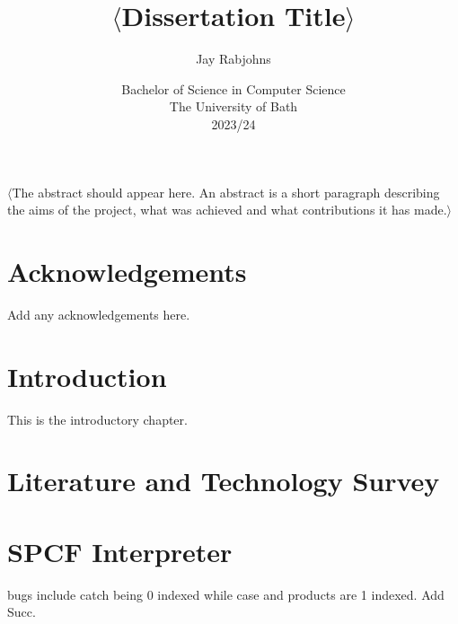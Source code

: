 \documentclass[12pt,a4paper]{report}
\title{\bf $\langle$Dissertation Title$\rangle$}
\author{Jay Rabjohns}
\date{Bachelor of Science in Computer Science\\ 
      The University of Bath\\
      2023/24}
\theoremstyle{definition}
\theoremstyle{remark}
\begin{document}
\hypersetup{pageanchor=false}

\lstset{language=Haskell,breaklines,breakatwhitespace,basicstyle=\small}

\setcounter{page}{0}

\maketitle
\newpage

\newpage

\hypersetup{pageanchor=true}
\abstract
$\langle$The abstract should appear here. An abstract is a short paragraph describing the aims of the project, what was achieved and what contributions it has made.$\rangle$
\newpage

\tableofcontents
\newpage



\chapter*{Acknowledgements}
Add any acknowledgements here.

\newpage
\setcounter{page}{1}

\chapter{Introduction}
This is the introductory chapter.

\chapter{Literature and Technology Survey}

\chapter{SPCF Interpreter}

bugs include catch being 0 indexed while case and products are 1 indexed. Add Succ.
\end{document}
